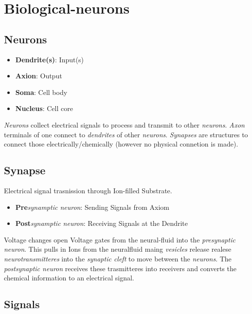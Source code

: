 \documentclass[
    fontsize      = 11pt,
    paper         = a4,
    twoside       = false,
    parskip       = half,
    pagesize      = false,
]{scrartcl}
\author{Robin Prillwitz}
\date{09. August 2022}
\providecommand{\tightlist}{%
  \setlength{\itemsep}{0pt}\setlength{\parskip}{0pt}}
\begin{document}
\hypertarget{biological-neurons}{%
\section{Biological-neurons}\label{biological-neurons}}

\hypertarget{neurons}{%
\subsection{Neurons}\label{neurons}}

\begin{itemize}
\tightlist
\item
  \textbf{Dendrite(s)}: Input(s)
\item
  \textbf{Axion}: Output
\item
  \textbf{Soma}: Cell body
\item
  \textbf{Nucleus}: Cell core
\end{itemize}

\emph{Neurons} collect electrical signals to process and transmit to
other \emph{neurons}. \emph{Axon} terminals of one connect to
\emph{dendrites} of other \emph{neurons}. \emph{Synapses} are structures
to connect those electrically/chemically (however no physical connetion
is made).

\hypertarget{synapse}{%
\subsection{Synapse}\label{synapse}}

Electrical signal trasnission through Ion-filled Substrate.

\begin{itemize}
\tightlist
\item
  \textbf{Pre}\emph{synamptic neuron}: Sending Signals from Axiom
\item
  \textbf{Post}\emph{synamptic neuron}: Receiving Signals at the
  Dendrite
\end{itemize}

Voltage changes open Voltage gates from the neural-fluid into the
\emph{presynaptic neuron}. This pulls in Ions from the neuralfluid maing
\emph{vesicles} release realese \emph{neurotransmitteres} into the
\emph{synaptic cleft} to move between the \emph{neurons}. The
\emph{postsynaptic neuron} receives these trasmitteres into receivers
and converts the chemical information to an electrical signal.

\hypertarget{signals}{%
\subsection{Signals}\label{signals}}
\end{document}
